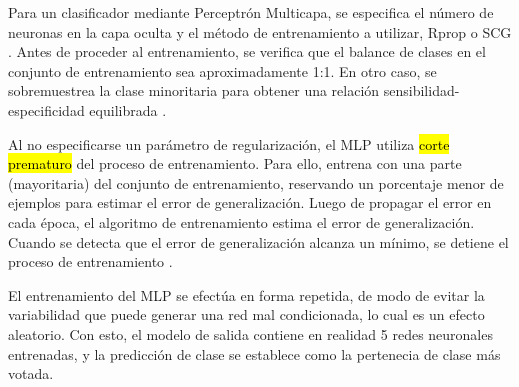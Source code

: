\documentclass[12pt,bibliography=oldstyle,DIV=12,parskip=half-]{scrreprt}
\begin{document}
Para un clasificador mediante Perceptrón Multicapa, se especifica el
número de neuronas en la capa oculta y el método de entrenamiento a
utilizar, Rprop \cite{rprop} o SCG \cite{scg}.  Antes de proceder al
entrenamiento, se verifica que el balance de clases en el conjunto de
entrenamiento sea aproximadamente 1:1.  En otro caso, se sobremuestrea
la clase minoritaria para obtener una relación
sensibilidad-especificidad equilibrada \cite{JUSTIFICAR}.

Al no especificarse un parámetro de regularización, el MLP utiliza
\hl{corte prematuro} del proceso de entrenamiento. Para ello, entrena
con una parte (mayoritaria) del conjunto de entrenamiento, reservando
un porcentaje menor de ejemplos para estimar el error de
generalización.  Luego de propagar el error en cada época, el
algoritmo de entrenamiento estima el error de generalización. Cuando
se detecta que el error de generalización alcanza un mínimo, se
detiene el proceso de entrenamiento \cite{JUSTIFICAR}.

El entrenamiento del MLP se efectúa en forma repetida, de modo de
evitar la variabilidad que puede generar una red mal condicionada,
lo cual es un efecto aleatorio.  Con esto, el modelo de salida contiene
en realidad 5 redes neuronales entrenadas, y la predicción de clase se
establece como la pertenecia de clase más votada.




\end{document}
